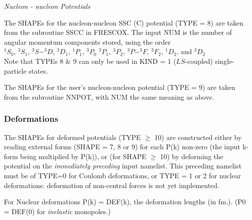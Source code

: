 \documentclass[11pt]{article}
\begin{document}
\bigskip
{\em Nucleon - nucleon Potentials}
\bigskip

The SHAPEs for the nucleon-nucleon SSC (C) potential (TYPE = 8) are
taken from the subroutine SSCC in FRESCOX.
The input NUM is the number of angular momentum components stored,
using the order
\\
 $^1S_{0}$, $^3S_{1}$, $^3S-^3D$, $^3D_{1}$, $^1P_{1}$, $^3P_{0}$
$^3P_{1}$, $^3P_2$, $^3P-^3F$, $^3F_2$, $^1D_2$, and $^3D_2$
\\
Note that TYPEs 8 \& 9 can only be used in KIND = 1 ($LS$-coupled)
single-particle states.


The SHAPEs for the user's nucleon-nucleon potential (TYPE = 9) are
taken from the subroutine NNPOT, with NUM the same meaning as above.

\subsubsection{Deformations}


The SHAPEs for deformed potentials (TYPE $\geq$ 10) are constructed either
by reading external forms (SHAPE = 7, 8 or 9) for each P(k) non-zero
(the input k-form being multiplied by P(k)),
or (for SHAPE $\geq$ 10) by deforming the potential on the
{\em immediately preceding} input namelist.
This preceding namelist must be of TYPE=0 for Coulomb deformations,
or TYPE = 1 or 2 for nuclear deformations: deformation of non-central
forces is not yet implemented.
\bigskip

For Nuclear deformations P(k) = DEF(k), the deformation lengths (in fm.).
(P0 = DEF(0) for {\em inelastic} monopoles.)
%
\end{document}

